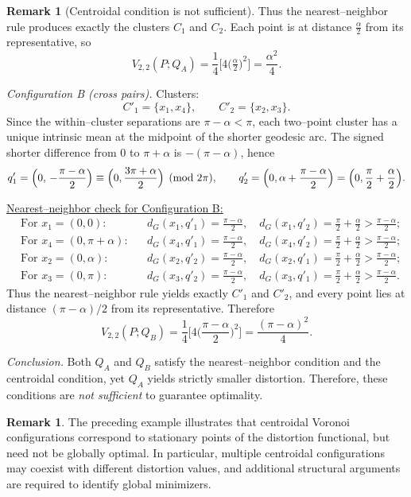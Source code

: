 \documentclass[12pt, reqno]{amsart}
\theoremstyle{plain}
\theoremstyle{definition}
\newtheorem{remark}[subsection]{Remark}
\begin{document}
\begin{remark}[Centroidal condition is not sufficient]
Thus the nearest--neighbor rule produces exactly the clusters $C_1$ and $C_2$.  
Each point is at distance $\frac{\alpha}{2}$ from its representative, so
\[
V_{2,2}(P;Q_A)=\frac{1}{4}\Big[4\big(\tfrac{\alpha}{2}\big)^2\Big]=\frac{\alpha^2}{4}.
\]

\medskip
\emph{Configuration B (cross pairs).}
Clusters:
\[
C'_1=\{x_1,x_4\},\qquad C'_2=\{x_2,x_3\}.
\]
Since the within–cluster separations are $\pi-\alpha<\pi$, each two–point cluster has a unique intrinsic mean at the midpoint of the shorter geodesic arc. The signed shorter difference from $0$ to $\pi+\alpha$ is $-(\pi-\alpha)$, hence
\[
q'_1=\Bigl(0,\,-\frac{\pi-\alpha}{2}\Bigr)\equiv \Bigl(0,\frac{3\pi+\alpha}{2}\Bigr)\pmod{2\pi},\qquad
q'_2=\Bigl(0,\alpha+\frac{\pi-\alpha}{2}\Bigr)=\Bigl(0,\frac{\pi}{2}+\frac{\alpha}{2}\Bigr).
\]

\underline{Nearest–neighbor check for Configuration B:}
\[
\begin{aligned}
&\text{For }x_1=(0,0): && d_G(x_1,q'_1)=\tfrac{\pi-\alpha}{2},\quad d_G(x_1,q'_2)=\tfrac{\pi}{2}+\tfrac{\alpha}{2}>\tfrac{\pi-\alpha}{2};\\
&\text{For }x_4=(0,\pi+\alpha): && d_G(x_4,q'_1)=\tfrac{\pi-\alpha}{2},\quad d_G(x_4,q'_2)=\tfrac{\pi}{2}+\tfrac{\alpha}{2}>\tfrac{\pi-\alpha}{2};\\
&\text{For }x_2=(0,\alpha): && d_G(x_2,q'_2)=\tfrac{\pi-\alpha}{2},\quad d_G(x_2,q'_1)=\tfrac{\pi}{2}+\tfrac{\alpha}{2}>\tfrac{\pi-\alpha}{2};\\
&\text{For }x_3=(0,\pi): && d_G(x_3,q'_2)=\tfrac{\pi-\alpha}{2},\quad d_G(x_3,q'_1)=\tfrac{\pi}{2}+\tfrac{\alpha}{2}>\tfrac{\pi-\alpha}{2}.
\end{aligned}
\]
Thus the nearest–neighbor rule yields exactly $C'_1$ and $C'_2$, and every point lies at distance $(\pi-\alpha)/2$ from its representative. Therefore
\[
V_{2,2}(P;Q_B)=\frac{1}{4}\Big[4\Big(\frac{\pi-\alpha}{2}\Big)^2\Big]=\frac{(\pi-\alpha)^2}{4}.
\]

\medskip
\emph{Conclusion.}  
Both $Q_A$ and $Q_B$ satisfy the nearest--neighbor condition and the centroidal condition, yet $Q_A$ yields strictly smaller distortion. Therefore, these conditions are \emph{not sufficient} to guarantee optimality.
\end{remark}

\begin{remark}
The preceding example illustrates that centroidal Voronoi configurations correspond
to stationary points of the distortion functional, but need not be globally optimal.
In particular, multiple centroidal configurations may coexist with different
distortion values, and additional structural arguments are required to identify
global minimizers.
\end{remark}
 
\end{document}
